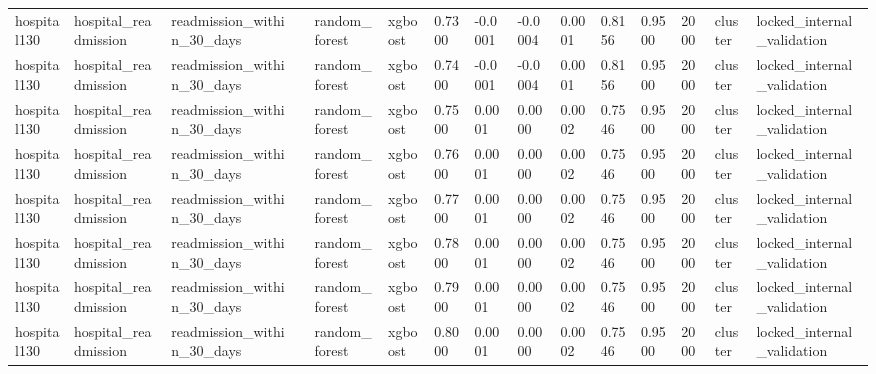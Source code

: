 \begin{tabular}{lllllllllllllll}
hospital130 & hospital\_readmission & readmission\_within\_30\_days &  & random\_forest & xgboost & 0.7300 & -0.0001 & -0.0004 & 0.0001 & 0.8156 & 0.9500 & 2000 & cluster & locked\_internal\_validation \\
hospital130 & hospital\_readmission & readmission\_within\_30\_days &  & random\_forest & xgboost & 0.7400 & -0.0001 & -0.0004 & 0.0001 & 0.8156 & 0.9500 & 2000 & cluster & locked\_internal\_validation \\
hospital130 & hospital\_readmission & readmission\_within\_30\_days &  & random\_forest & xgboost & 0.7500 & 0.0001 & 0.0000 & 0.0002 & 0.7546 & 0.9500 & 2000 & cluster & locked\_internal\_validation \\
hospital130 & hospital\_readmission & readmission\_within\_30\_days &  & random\_forest & xgboost & 0.7600 & 0.0001 & 0.0000 & 0.0002 & 0.7546 & 0.9500 & 2000 & cluster & locked\_internal\_validation \\
hospital130 & hospital\_readmission & readmission\_within\_30\_days &  & random\_forest & xgboost & 0.7700 & 0.0001 & 0.0000 & 0.0002 & 0.7546 & 0.9500 & 2000 & cluster & locked\_internal\_validation \\
hospital130 & hospital\_readmission & readmission\_within\_30\_days &  & random\_forest & xgboost & 0.7800 & 0.0001 & 0.0000 & 0.0002 & 0.7546 & 0.9500 & 2000 & cluster & locked\_internal\_validation \\
hospital130 & hospital\_readmission & readmission\_within\_30\_days &  & random\_forest & xgboost & 0.7900 & 0.0001 & 0.0000 & 0.0002 & 0.7546 & 0.9500 & 2000 & cluster & locked\_internal\_validation \\
hospital130 & hospital\_readmission & readmission\_within\_30\_days &  & random\_forest & xgboost & 0.8000 & 0.0001 & 0.0000 & 0.0002 & 0.7546 & 0.9500 & 2000 & cluster & locked\_internal\_validation \\
\hline
\end{tabular}
